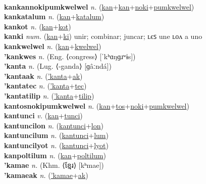  \label{kanfolnokipumkwelwel} \\
\textbf{kankannokipumkwelwel} \textit{n.} (\hyperref[kan]{kan}+\hyperref[kan]{kan}+\hyperref[noki]{noki}+\hyperref[pumkwelwel]{pumkwelwel})
 \label{kankannokipumkwelwel} \\
\textbf{kankatalum} \textit{n.} (\hyperref[kan]{kan}+\hyperref[katalum]{katalum})
 \label{kankatalum} \\
\textbf{kankot} \textit{n.} (\hyperref[kan]{kan}+\hyperref[kot]{kot})
 \label{kankot} \\
\textbf{kanki} \textit{num.} (\hyperref[kan]{kan}+\hyperref[ki]{ki})
unir; combinar; juncar; ʟєꜱ une ʟᴏᴧ a uno \label{kanki} \\
\textbf{kankwelwel} \textit{n.} (\hyperref[kan]{kan}+\hyperref[kwelwel]{kwelwel})
 \label{kankwelwel} \\
\textbf{'kankwes} \textit{n.} (Eng. ⟨congress⟩ [ˈkʰɑŋɡɹʷɨs])
 \label{'kankwes} \\
\textbf{'kanta} \textit{n.} (Lug. ⟨-ganda⟩ [ɡâːndá])
 \label{'kanta} \\
\textbf{'kantaak} \textit{n.} (\hyperref['kanta]{'kanta}+\hyperref[ak]{ak})
 \label{'kantaak} \\
\textbf{'kantatec} \textit{n.} (\hyperref['kanta]{'kanta}+\hyperref[tec]{tec})
 \label{'kantatec} \\
\textbf{'kantatilip} \textit{n.} (\hyperref['kanta]{'kanta}+\hyperref[tilip]{tilip})
 \label{'kantatilip} \\
\textbf{kantosnokipumkwelwel} \textit{n.} (\hyperref[kan]{kan}+\hyperref[tos]{tos}+\hyperref[noki]{noki}+\hyperref[pumkwelwel]{pumkwelwel})
 \label{kantosnokipumkwelwel} \\
\textbf{kantunci} \textit{v.} (\hyperref[kan]{kan}+\hyperref[tunci]{tunci})
 \label{kantunci} \\
\textbf{kantuncilon} \textit{n.} (\hyperref[kantunci]{kantunci}+\hyperref[lon]{lon})
 \label{kantuncilon} \\
\textbf{kantuncilum} \textit{n.} (\hyperref[kantunci]{kantunci}+\hyperref[lum]{lum})
 \label{kantuncilum} \\
\textbf{kantuncilyot} \textit{n.} (\hyperref[kantunci]{kantunci}+\hyperref[lyot]{lyot})
 \label{kantuncilyot} \\
\textbf{kanpoltilum} \textit{n.} (\hyperref[kan]{kan}+\hyperref[poltilum]{poltilum})
 \label{kanpoltilum} \\
\textbf{'kamae} \textit{n.} (Khm. ⟨ខ្មែរ⟩ [kʰmae])
 \label{'kamae} \\
\textbf{'kamaeak} \textit{n.} (\hyperref['kamae]{'kamae}+\hyperref[ak]{ak})
